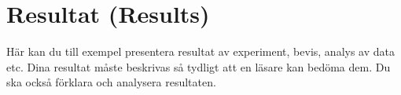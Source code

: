 \section{Resultat (Results)}

H\"{a}r kan du till exempel presentera resultat av experiment, bevis, analys av data etc. Dina resultat m\r{a}ste beskrivas s\r{a} tydligt att en l\"{a}sare kan bed\"{o}ma dem.  Du ska ocks\r{a} f\"{o}rklara och analysera resultaten.


